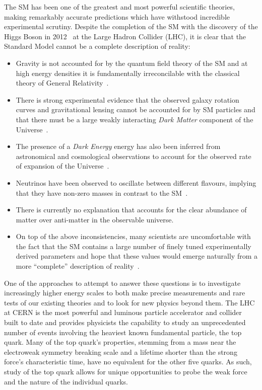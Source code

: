 The SM has been one of the greatest and most powerful scientific theories, making remarkably accurate predictions which have withstood incredible experimental scrutiny.
Despite the completion of the SM with the discovery of the Higgs Boson in 2012~\cite{HiggsCMS,HiggsATLAS} at the Large Hadron Collider (LHC), it is clear that the Standard Model cannot be a complete description of reality:
\begin{itemize}
\item Gravity is not accounted for by the quantum field theory of the SM and at high energy densities it is fundamentally irreconcilable with the classical theory of General Relativity~\cite{}.
\item There is strong experimental evidence that the observed galaxy rotation curves and gravitational lensing cannot be accounted for by SM particles and that there must be a large weakly interacting \emph{Dark Matter} component of the Universe~\cite{Bertone:2004pz}.
\item The presence of a \emph{Dark Energy} energy has also been inferred from astronomical and cosmological observations to account for the observed rate of expansion of the Universe~\cite{Peebles:2002gy}.
\item Neutrinos have been observed to oscillate between different flavours, implying that they have non-zero masses in contrast to the SM~\cite{Fukuda:1998mi,Ahmad:2001an}.
\item There is currently no explanation that accounts for the clear abundance of matter over anti-matter in the observable universe.
\item On top of the above inconsistencies, many scientists are uncomfortable with the fact that the SM contains a large number of finely tuned experimentally derived parameters and hope that these values would emerge naturally from a more ``complete'' description of reality~\cite{}.
\end{itemize}

One of the approaches to attempt to answer these questions is to investigate increasingly higher energy scales to both make precise measurements and rare tests of our existing theories and to look for new physics beyond them.
The LHC at CERN is the most powerful and luminous particle accelerator and collider built to date and provides physicists the capability to study an unprecedented number of events involving the heaviest known fundamental particle, the top quark.
Many of the top quark's properties, stemming from a mass near the electroweak symmetry breaking scale and a lifetime shorter than the strong force’s characteristic time, have no equivalent for the other five quarks.
As such, study of the top quark allows for unique opportunities to probe the weak force and the nature of the individual quarks.

